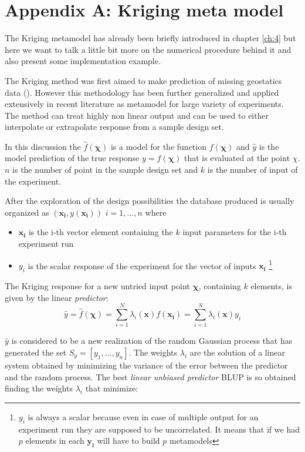 \chapter*{Appendix A: Kriging meta model}

The Kriging metamodel has already been briefly introduced in chapter \ref{ch:4} but here we want to talk a little bit more on the numerical procedure behind it and also present some implementation example.

The Kriging method was first aimed to make prediction of missing geostatics data (\citet{krige1951statistical}). However this methodology has been further generalized and applied extensively in recent literature as metamodel for large variety of experiments.
The method can treat highly non linear output and can be used to either interpolate or extrapolate response from a sample design set.

In this discussion the $\hat{f}(\boldsymbol{\chi})$ is a model for the function $f(\boldsymbol{\chi})$ and $\hat{y}$ is the model prediction of the true response $y = f(\boldsymbol{\chi})$ that is evaluated at the point $\chi$. $n$ is the number of point in the sample design set and $k$ is the number of input of the experiment.

After the exploration of the design possibilities the database produced is usually organized as $(\mathbf{x_i}, y(\mathbf{x_i}))$  $i=1,...,n$ where
\begin{itemize}
	\item $\mathbf{x_i}$ is the i-th vector element containing the $k$ input parameters for the i-th experiment run
	\item $y_i$ is the scalar response of the experiment for the vector of inputs $\mathbf{x_i}$ \footnote{$y_i$ is always a scalar because even in case of multiple output for an experiment run they are supposed to be uncorrelated. It means that if we had $p$ elements in each $\mathbf{y_i}$ will have to build $p$ metamodels}
\end{itemize}

The Kriging response for a new untried input point $\boldsymbol{\chi}$, containing $k$ elements, is given by the linear \textit{predictor}:
\begin{equation}
\hat{y} = \hat{f}(\boldsymbol{\chi}) = \sum_{i=1}^{N} \lambda_i(\mathbf{x}) f(\mathbf{x_i}) =  \sum_{i=1}^{N} \lambda_i(\mathbf{x}) y_i
\end{equation}

$\hat{y}$ is considered to be a new realization of the random Gaussian process that has generated the set $S_y = [y_1,...,y_n]$.
The weights $\lambda_i$ are the solution of a linear system obtained by minimizing the variance of the error between the predictor and the random process.
The best \textit{linear unbiased predictor} BLUP is so obtained finding the weights $\lambda_i$ that minimize:

